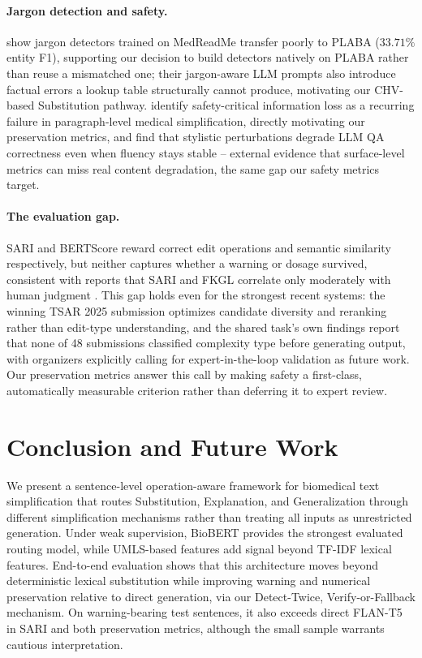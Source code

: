 \documentclass[11pt]{article}
\begin{document}
\paragraph{Jargon detection and safety.}
\citet{papandreou2025jargon} show jargon detectors trained on MedReadMe
transfer poorly to PLABA ($33.71\%$ entity F1), supporting our decision to
build detectors natively on PLABA rather than reuse a mismatched one; their
jargon-aware LLM prompts also introduce factual errors a lookup table
structurally cannot produce, motivating our CHV-based Substitution pathway.
\citet{devaraj2021medical} identify safety-critical information loss as a
recurring failure in paragraph-level medical simplification, directly
motivating our preservation metrics, and \citet{rahman2025spqa} find that
stylistic perturbations degrade LLM QA correctness even when fluency stays
stable -- external evidence that surface-level metrics can miss real
content degradation, the same gap our safety metrics target.

\paragraph{The evaluation gap.}
SARI \citep{xu2016sari} and BERTScore \citep{zhang2020bertscore} reward
correct edit operations and semantic similarity respectively, but neither
captures whether a warning or dosage survived, consistent with reports that
SARI and FKGL correlate only moderately with human judgment
\citep{alvamanchego2021unsuitability}. This gap holds even for the strongest
recent systems: the winning TSAR 2025 submission \citep{miyata2025ehimenlp}
optimizes candidate diversity and reranking rather than edit-type
understanding, and the shared task's own findings
\citep{alvamanchego2025tsarfindings} report that none of 48 submissions
classified complexity type before generating output, with organizers
explicitly calling for expert-in-the-loop validation as future work. Our
preservation metrics answer this call by making safety a first-class,
automatically measurable criterion rather than deferring it to expert
review.

\section{Conclusion and Future Work}
\label{sec:conclusion}

We present a sentence-level operation-aware framework for biomedical text
simplification that routes Substitution, Explanation, and Generalization
through different simplification mechanisms rather than treating all inputs
as unrestricted generation. Under weak supervision, BioBERT provides the
strongest evaluated routing model, while UMLS-based features add signal
beyond TF-IDF lexical features. End-to-end evaluation shows that this
architecture moves beyond deterministic lexical substitution while improving
warning and numerical preservation relative to direct generation, via our
Detect-Twice, Verify-or-Fallback mechanism. On warning-bearing test sentences, it also exceeds direct
FLAN-T5 in SARI and both preservation metrics, although the small sample
warrants cautious interpretation.
\end{document}
